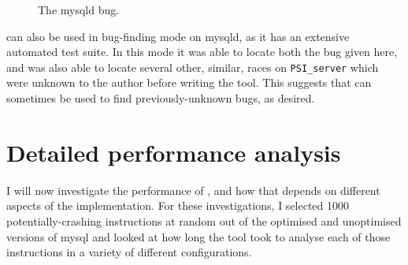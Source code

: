 \begin{figure}
  \caption{The mysqld bug.}
  \label{fig:eval:mysqld}
\end{figure}

{\Implementation} can also be used in bug-finding mode on mysqld, as
it has an extensive automated test suite.  In this mode it was able to
locate both the bug given here, and was also able to locate several
other, similar, races on \texttt{PSI\_server} which were unknown to
the author before writing the tool.  This suggests that
{\implementation} can sometimes be used to find previously-unknown
bugs, as desired.


\section{Detailed performance analysis}
\label{sect:eval:time_details}

I will now investigate the performance of {\implementation}, and how
that depends on different aspects of the implementation.  For these
investigations, I selected 1000 potentially-crashing instructions at
random out of the optimised and unoptimised versions of mysql and
looked at how long the tool took to analyse each of those instructions
in a variety of different configurations.


